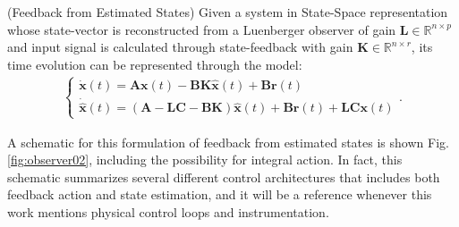 \documentclass[a4paper,11pt]{book}
\numberwithin{figure}{chapter}
\numberwithin{equation}{chapter}
\numberwithin{table}{chapter}
\theoremstyle{definition}
\newtheorem{definition}{Definition}[chapter]
\newcounter{boxed-theorem}
\newcounter{boxed-lemma}
\newcounter{boxed-definition}
\newenvironment{boxed-definition}[1]
{\colorlet{shadecolor}{pastelYellow!15} \begin{shaded} \begin{definition}{#1}}
{\end{definition} \end{shaded}}
\newcounter{boxed-example}
\begin{document}
\begin{boxed-definition}{(Feedback from Estimated States)} \label{def:fdbckLuenberger}
    Given a system in State-Space representation whose state-vector is reconstructed from a Luenberger observer of gain $\bm{L} \in \mathbb{R}^{n \times p}$ and input signal is calculated through state-feedback with gain $\bm{K} \in \mathbb{R}^{n \times r}$, its time evolution can be represented through the model:
    \begin{align} \label{eq:fdbckLuenberger01}
    \begin{cases}
        \dot{\bm{x}}(t) = \bm{A} \bm{x}(t) - \bm{B} \bm{K} \hat{\bm{x}}(t) + \bm{B} \bm{r}(t) \\
        \dot{\hat{\bm{x}}}(t) = \left(\bm{A} - \bm{L} \bm{C} - \bm{B} \bm{K} \right) \hat{\bm{x}}(t) + \bm{B} \bm{r}(t) + \bm{L} \bm{C} \bm{x}(t) 
    \end{cases}
    .\end{align}
\end{boxed-definition} 

A schematic for this formulation of feedback from estimated states is shown Fig. \ref{fig:observer02}, including the possibility for integral action. In fact, this schematic summarizes several different control architectures that includes both feedback action and state estimation, and it will be a reference whenever this work mentions physical control loops and instrumentation.
\end{document}
